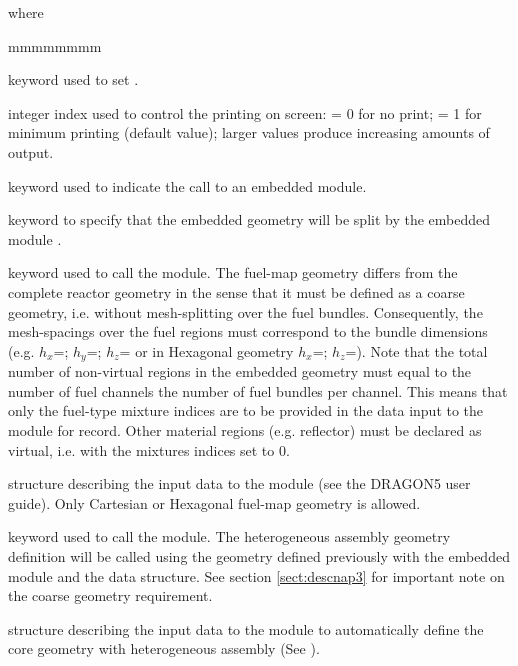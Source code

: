 \noindent where
\begin{ListeDeDescription}{mmmmmmmm}

\item[\moc{EDIT}] keyword used to set .

\item[\dusa{iprint}] integer index used to control the printing on screen:
 = 0 for no print; = 1 for minimum printing (default value); larger values
produce increasing amounts of output.

\item[\moc{:::}] keyword used to indicate the call to an embedded module.

\item[\moc{SPLIT-NAP:}] keyword to specify that the embedded geometry will be split by the embedded  module .

\item[\moc{GEO:}] keyword used to call the  module.
The fuel-map geometry differs from the complete reactor geometry
in the sense that it must be defined as a coarse geometry, i.e. without
mesh-splitting over the fuel bundles. Consequently, the mesh-spacings
over the fuel regions must correspond to the bundle dimensions (e.g.
$h_{x}$=; $h_{y}$=; $h_{z}$= or in
 Hexagonal geometry $h_{x}$=; $h_{z}$=).
Note that the total number of non-virtual regions in the embedded
geometry must equal to the number of fuel channels  the
number of fuel bundles per channel. This means that only the fuel-type
mixture indices are to be provided in the data input to the 
module for  record. Other material regions (e.g. reflector) must
be declared as virtual, i.e. with the mixtures indices set to 0.

\item[\dstr{descgeo}] structure describing the input data to the
 module (see the DRAGON5 user guide\cite{dragon}). Only
 Cartesian or  Hexagonal fuel-map geometry is allowed.

\item[\moc{NAP:}] keyword used to call the  module. The heterogeneous assembly geometry definition will be called using the geometry defined previously with the embedded module  and the  data structure. See section \ref{sect:descnap3} for important note on the coarse geometry requirement.

\item[\dstr{descnap3}] structure describing the input data to the
 module to automatically define the core geometry with heterogeneous assembly (See ).


\end{ListeDeDescription}
